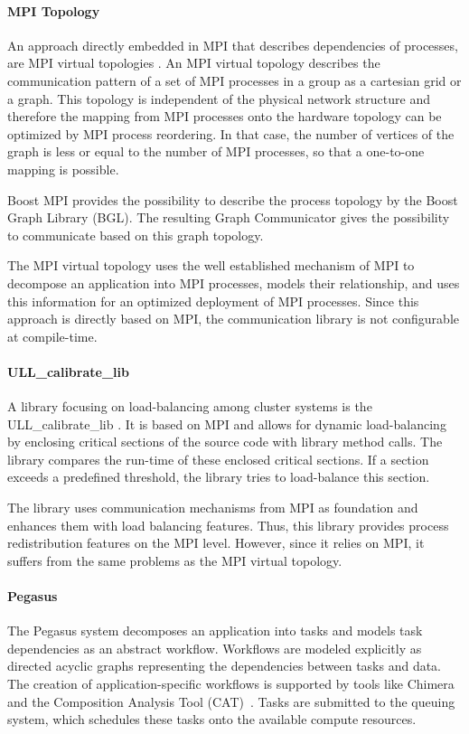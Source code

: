 \paragraph*{MPI Topology}
An approach directly embedded in MPI that describes dependencies of
processes, are MPI virtual topologies \cite{ref:mpi_topology}. An MPI
virtual topology describes the communication pattern of a set of MPI
processes in a group as a cartesian grid or a graph.  This topology is
independent of the physical network structure and therefore the
mapping from MPI processes onto the hardware topology can be optimized
by MPI process reordering. In that case, the number of vertices of the
graph is less or equal to the number of MPI processes, so that a
one-to-one mapping is possible.

Boost MPI provides the possibility to describe the process topology by
the Boost Graph Library (BGL)\cite{ref:boost_bgl}.  The resulting
Graph Communicator \cite{ref:boost_graph_communicator} gives the
possibility to communicate based on this graph topology.

The MPI virtual topology uses the well established
mechanism of MPI to decompose an application into MPI processes,
models their relationship, and uses this information for an optimized
deployment of MPI processes.  Since this approach is directly based on
MPI, the communication library is not configurable at compile-time.

\paragraph*{ULL\_calibrate\_lib}
A library focusing on load-balancing among cluster systems is the
ULL\_calibrate\_lib \cite{ref:ull_calibrate_lib}. It is based on MPI
and allows for dynamic load-balancing by enclosing critical sections
of the source code with library method calls. The library compares the
run-time of these enclosed critical sections. If a section exceeds a
predefined threshold, the library tries to load-balance this section.

The library uses communication mechanisms from MPI as foundation and
enhances them with load balancing features. Thus, this library
provides process redistribution features on the MPI level. However, since
it relies on MPI, it suffers from the same problems as the MPI virtual
topology.

\paragraph*{Pegasus}
The Pegasus system \cite{ref:pegasus} decomposes an application into
tasks and models task dependencies as an abstract workflow. Workflows
are modeled explicitly as directed acyclic graphs representing the
dependencies between tasks and data. The creation of
application-specific workflows is supported by tools like
Chimera~\cite{Foster:2002:CAD:646500.695938} and the Composition
Analysis Tool (CAT)~\cite{Kim:2004:IAI:964442.964466}.  Tasks are submitted to the
queuing system, which schedules these tasks onto the available compute
resources.

